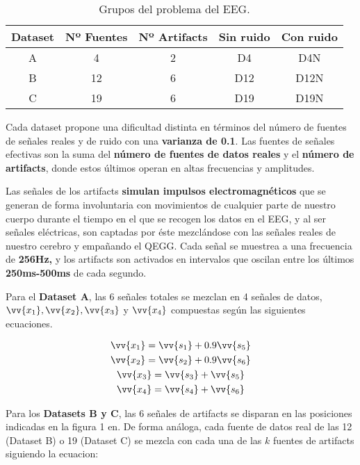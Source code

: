 \begin{table}[htbp]
	\begin{center}
		\begin{tabular}{| c | c | c | c | c |}
			\hline
			Dataset& Nº Fuentes & Nº Artifacts & Sin ruido & Con ruido \\
			\hline \hline
			A & 4 & 2 & D4 & D4N\\ \hline
			B & 12 & 6 & D12 & D12N \\ \hline
			C & 19 & 6 & D19 & D19N \\ \hline
		\end{tabular}
		\caption{Grupos del problema del EEG.}
		\label{tabla:gruposEEG}
	\end{center}
\end{table}

Cada dataset propone una dificultad distinta en términos del número de fuentes de señales reales y de ruido con una \textbf{varianza de 0.1}. Las fuentes de señales efectivas son la suma del \textbf{número de fuentes de datos reales} y el \textbf{número de artifacts}, donde estos últimos operan en altas frecuencias y amplitudes. 

Las señales de los artifacts \textbf{simulan impulsos electromagnéticos} que se generan de forma involuntaria con movimientos de cualquier parte de nuestro cuerpo durante el tiempo en el que se recogen los datos en el EEG, y al ser señales eléctricas, son captadas por éste mezclándose con las señales reales de nuestro cerebro y empañando el QEGG. Cada señal se muestrea a una frecuencia de \textbf{256Hz,} y los artifacts son activados en intervalos que oscilan entre los últimos \textbf{250ms-500ms} de cada segundo. 

Para el \textbf{Dataset A}, las 6 señales totales se mezclan en 4 señales de datos, $\vv{x_1}, \vv{x_2}, \vv{x_3}$ y $ \vv{x_4} $ compuestas según las siguientes ecuaciones.

\begin{equation}\label{eq:D4}
	\begin{gathered}
		\vv{x_1} = \vv{s_1} + 0.9\vv{s_5}\\
		\vv{x_2} = \vv{s_2} + 0.9\vv{s_6}\\
		\vv{x_3} = \vv{s_3} + \vv{s_5}\\
		\vv{x_4} = \vv{s_4} + \vv{s_6}\\
	\end{gathered}
\end{equation}

Para los \textbf{Datasets B y C}, las 6 señales de artifacts se disparan en las posiciones indicadas  en la figura 1 en\cite{EvolutionaryBigOpt}. De forma análoga, cada fuente de datos real de las 12 (Dataset B) o 19 (Dataset C) se mezcla con cada una de las $k$ fuentes de artifacts siguiendo la ecuacion:


